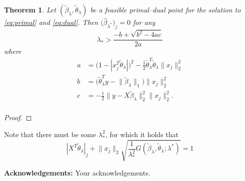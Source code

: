 \documentclass[b5paper,10pt,abstractoff,DIV=calc,headings=normal,twoside]{scrartcl}
\newcommand{\acknowledgements}{\par\mbox{}\par\noindent\textbf{Acknowledgements: }}
\theoremstyle{plain}
\newtheorem{theorem}{Theorem}
\theoremstyle{definition}
\theoremstyle{remark}
\begin{document}
\begin{theorem}
  \label{thm:look-ahead}
  Let
  \((\tilde\beta_\lambda,\tilde\theta_\lambda)\) be
  a feasible primal--dual point for the solution to
  \eqref{eq:primal} and \eqref{eq:dual}. Then
  \(\big(\hat\beta_{\lambda^*}\big)_j = 0\) for any
  \[
    \lambda_* > \frac{-b + \sqrt{b^2 - 4ac}}{2a}
  \]
  where
  \[
    \begin{aligned}
      a & = \big( 1 - | x_j^T \tilde\theta_\lambda|\big)^2 -
      \frac 12 \tilde\theta_\lambda^T \tilde\theta_\lambda \lVert x_j\rVert_2^2      \\
      b & = \big(\tilde\theta_\lambda^T y - \lVert \tilde\beta_\lambda \rVert_1\big)
      \lVert x_j \rVert_2^2                                                          \\
      c & = - \frac 12 \lVert y - X\tilde\beta_\lambda\rVert_2^2
      \lVert x_j\rVert_2^2.                                                          \\
    \end{aligned}
  \]
\end{theorem}
\begin{proof}

\end{proof}

Note that there must be some \(\lambda_*^2\), for which it holds that
\[
  |X^T \tilde \theta_\lambda|_j +
  \lVert x_j\rVert_2 \sqrt{\frac{1}{\lambda_*^2} G(\tilde \beta_\lambda, \tilde \theta_\lambda; \lambda^*)}
  = 1
\]

\acknowledgements{Your acknowledgements.}


\end{document}
